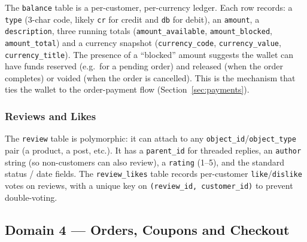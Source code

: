 \documentclass[11pt,a4paper]{article}
\begin{document}
The \texttt{balance} table is a per-customer, per-currency ledger.
Each row records: a \texttt{type} (3-char code, likely \texttt{cr}
for credit and \texttt{db} for debit), an \texttt{amount}, a
\texttt{description}, three running totals
(\texttt{amount\_available}, \texttt{amount\_blocked},
\texttt{amount\_total}) and a currency snapshot
(\texttt{currency\_code}, \texttt{currency\_value},
\texttt{currency\_title}). The presence of a ``blocked'' amount
suggests the wallet can have funds reserved (e.g.\ for a pending
order) and released (when the order completes) or voided (when the
order is cancelled). This is the mechanism that ties the wallet to
the order-payment flow (Section~\ref{sec:payments}).

\subsubsection{Reviews and Likes}

The \texttt{review} table is polymorphic: it can attach to any
\texttt{object\_id}/\texttt{object\_type} pair (a product, a post,
etc.). It has a \texttt{parent\_id} for threaded replies, an
\texttt{author} string (so non-customers can also review), a
\texttt{rating} (1--5), and the standard status / date fields.
The \texttt{review\_likes} table records per-customer
\texttt{like}/\texttt{dislike} votes on reviews, with a unique key
on \texttt{(review\_id, customer\_id)} to prevent double-voting.

\subsection{Domain 4 --- Orders, Coupons and Checkout}\label{sec:orders}
\end{document}
